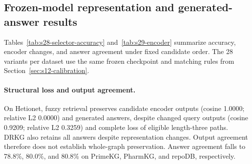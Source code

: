 \begin{revisionblock}
\subsection{Frozen-model representation and generated-answer results}
Tables~\ref{tab:s28-selector-accuracy} and~\ref{tab:s29-encoder} summarize accuracy, encoder changes, and answer agreement under fixed candidate order. The 28 variants per dataset use the same frozen checkpoint and matching rules from Section~\ref{sec:s12-calibration}.

\par{}\noindent\begin{minipage}{\linewidth}

\centering\small
{}
\label{tab:s28-selector-accuracy}


\end{minipage}\par\medskip



\par{}\noindent\begin{minipage}{\linewidth}

\centering\small
{}
\label{tab:s29-encoder}
\resizebox{\linewidth}{!}{}

\end{minipage}\par\medskip

\paragraph{Structural loss and output agreement.}
On Hetionet, fuzzy retrieval preserves candidate encoder outputs (cosine 1.0000; relative L2 0.0000) and generated answers, despite changed query outputs (cosine 0.9209; relative L2 0.3259) and complete loss of eligible length-three paths. DRKG also retains all answers despite representation changes. Output agreement therefore does not establish whole-graph preservation. Answer agreement falls to 78.8\%, 80.0\%, and 80.8\% on PrimeKG, PharmKG, and repoDB, respectively.


\end{revisionblock}
